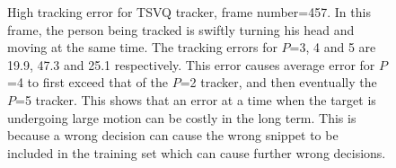 \begin{figure}[h!]
\centering
{}
\caption{High tracking error for TSVQ tracker, frame number=457.  In this frame, the person being tracked is swiftly turning his head and moving at the same time.  The tracking errors for $P$=3, 4 and 5 are 19.9, 47.3 and 25.1 respectively.  This error causes average error for $P$=4 to first exceed that of the $P$=2 tracker, and then eventually the $P$=5 tracker.  This shows that an error at a time when the target is undergoing large motion can be costly in the long term.  This is because a wrong decision can cause the wrong snippet to be included in the training set which can cause further wrong decisions.}
\label{fig:results_TSVQ_Dudek_FN457}
\end{figure}



\clearpage
\newpage
\normalsize





